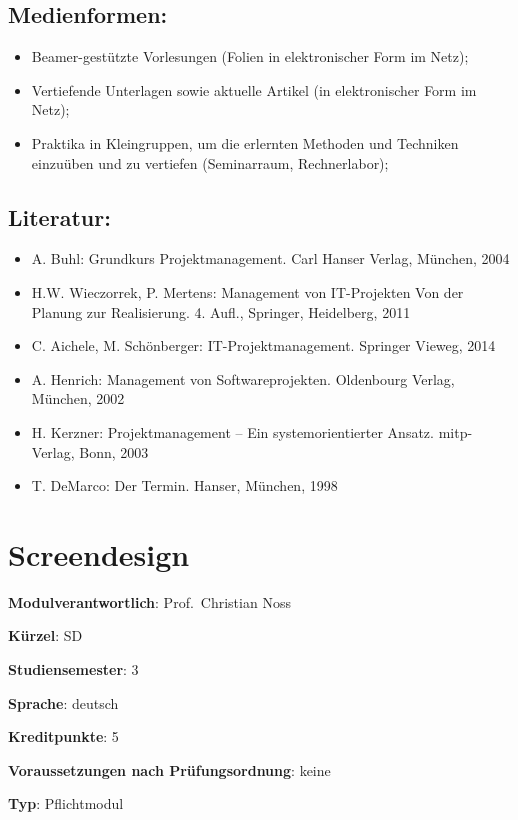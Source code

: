 \section*{Medienformen:}\label{medienformen-11}

\begin{itemize}
\tightlist
\item
  Beamer-gestützte Vorlesungen (Folien in elektronischer Form im Netz);
\item
  Vertiefende Unterlagen sowie aktuelle Artikel (in elektronischer Form
  im Netz);
\item
  Praktika in Kleingruppen, um die erlernten Methoden und Techniken
  einzuüben und zu vertiefen (Seminarraum, Rechnerlabor);
\end{itemize}

\section*{Literatur:}\label{literatur-16}

\begin{itemize}
\tightlist
\item
  A. Buhl: Grundkurs Projektmanagement. Carl Hanser Verlag, München,
  2004
\item
  H.W. Wieczorrek, P. Mertens: Management von IT-Projekten Von der
  Planung zur Realisierung. 4. Aufl., Springer, Heidelberg, 2011
\item
  C. Aichele, M. Schönberger: IT-Projektmanagement. Springer Vieweg,
  2014
\item
  A. Henrich: Management von Softwareprojekten. Oldenbourg Verlag,
  München, 2002
\item
  H. Kerzner: Projektmanagement -- Ein systemorientierter Ansatz.
  mitp-Verlag, Bonn, 2003
\item
  T. DeMarco: Der Termin. Hanser, München, 1998
\end{itemize}

\chapter{Screendesign}\label{screendesign}

\begin{modulHead}
\textbf{Modulverantwortlich}: Prof.~Christian
Noss
\end{modulHead}
\begin{modulHead}
\textbf{Kürzel}:
SD
\end{modulHead}
\begin{modulHead}
\textbf{Studiensemester}:
3
\end{modulHead}
\begin{modulHead}
\textbf{Sprache}:
deutsch
\end{modulHead}
\begin{modulHead}
\textbf{Kreditpunkte}:
5
\end{modulHead}
\begin{modulHead}
\textbf{Voraussetzungen nach
Prüfungsordnung}: keine
\end{modulHead}
\begin{modulHead}
\textbf{Typ}:
Pflichtmodul
\end{modulHead}


